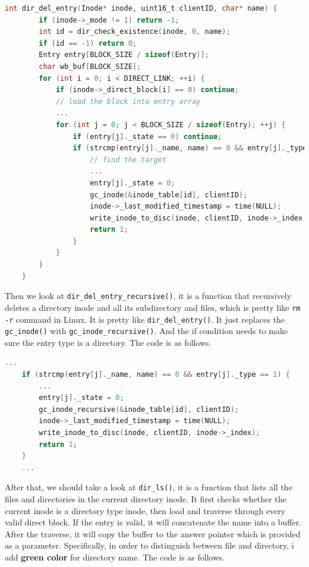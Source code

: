 \begin{lstlisting}[language=C]
    int dir_del_entry(Inode* inode, uint16_t clientID, char* name) {
        if (inode->_mode != 1) return -1;
        int id = dir_check_existence(inode, 0, name);
        if (id == -1) return 0;
        Entry entry[BLOCK_SIZE / sizeof(Entry)];
        char wb_buf[BLOCK_SIZE];
        for (int i = 0; i < DIRECT_LINK; ++i) {
            if (inode->_direct_block[i] == 0) continue;
            // load the block into entry array
            ... 
            for (int j = 0; j < BLOCK_SIZE / sizeof(Entry); ++j) {
                if (entry[j]._state == 0) continue;
                if (strcmp(entry[j]._name, name) == 0 && entry[j]._type == 0) {
                    // find the target 
                    ...
                    entry[j]._state = 0;
                    gc_inode(&inode_table[id], clientID);
                    inode->_last_modified_timestamp = time(NULL);
                    write_inode_to_disc(inode, clientID, inode->_index);
                    return 1;
                }
            }
        }
    }    
\end{lstlisting}

Then we look at \texttt{dir_del_entry_recursive()}, it is a function that recursively deletes a directory inode and all its subdirectory and files, which is pretty like \texttt{rm -r} command in Linux.
It is pretty like \texttt{dir_del_entry()}. It just replaces the \texttt{gc_inode()} with \texttt{gc_inode_recursive()}. And the if condition needs to make sure the entry type is a directory. The code is as follows.

\begin{lstlisting}[language=C]
    ...
    if (strcmp(entry[j]._name, name) == 0 && entry[j]._type == 1) {
        ...
        entry[j]._state = 0;
        gc_inode_recursive(&inode_table[id], clientID);
        inode->_last_modified_timestamp = time(NULL);
        write_inode_to_disc(inode, clientID, inode->_index);
        return 1;
    }    
    ... 
\end{lstlisting}

After that, we should take a look at \texttt{dir_ls()}, it is a function that lists all the files and directories in the current directory inode.
It first checks whether the current inode is a directory type inode, then load and traverse through every valid direct block. If the entry is valid, it will
concatenate the name into a buffer. After the traverse, it will copy the buffer to the answer pointer which is provided as a parameter.
Specifically, in order to distinguish between file and directory, i add \textbf{green color} for directory name.
The code is as follows.

